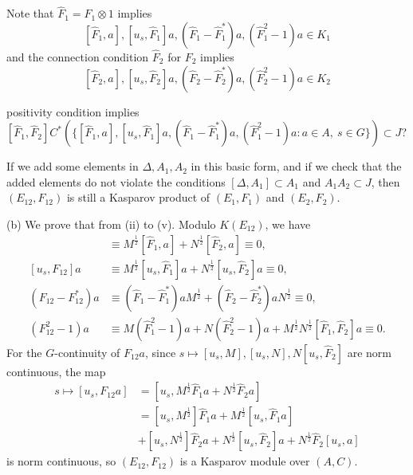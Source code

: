 \documentclass{../../large}
\begin{document}
\begin{prb}
\begin{parts}
Note that $\hat F_1=F_1\otimes1$ implies
\[[\hat F_1,a],[u_s,\hat F_1]a,(\hat F_1-\hat F_1^*)a,(\hat F_1^2-1)a\in K_1\]
and the connection condition $\hat F_2$ for $F_2$ implies
\[[\hat F_2,a],[u_s,\hat F_2]a,(\hat F_2-\hat F_2^*)a,(\hat F_2^2-1)a\in K_2\]


positivity condition implies $[\hat F_1,\hat F_2]C^*(\{[\hat F_1,a],[u_s,\hat F_1]a,(\hat F_1-\hat F_1^*)a,(\hat F_1^2-1)a:a\in A,\ s\in G\})\subset J$?


If we add some elements in $\Delta,A_1,A_2$ in this basic form, and if we check that the added elements do not violate the conditions $[\Delta,A_1]\subset A_1$ and $A_1A_2\subset J$, then $(E_{12},F_{12})$ is still a Kasparov product of $(E_1,F_1)$ and $(E_2,F_2)$.
\end{parts}
\end{prb}
\begin{pf}
(b)
We prove that from (ii) to (v).
Modulo $K(E_{12})$, we have
\begin{align*}
[F_{12},a]&\equiv M^{\frac12}[\hat F_1,a]+N^{\frac12}[\hat F_2,a]\equiv0,\\
[u_s,F_{12}]a&\equiv M^{\frac12}[u_s,\hat F_1]a+N^{\frac12}[u_s,\hat F_2]a\equiv0,\\
(F_{12}-F_{12}^*)a&\equiv(\hat F_1-\hat F_1^*)aM^{\frac12}+(\hat F_2-\hat F_2^*)aN^{\frac12}\equiv0,\\
(F_{12}^2-1)a&\equiv M(\hat F_1^2-1)a+N(\hat F_2^2-1)a+M^{\frac12}N^{\frac12}[\hat F_1,\hat F_2]a\equiv0.
\end{align*}
For the $G$-continuity of $F_{12}a$, since $s\mapsto[u_s,M],[u_s,N],N[u_s,\hat F_2]$ are norm continuous, the map
\begin{align*}
s\mapsto[u_s,F_{12}a]
&=[u_s,M^{\frac12}\hat F_1a+N^{\frac12}\hat F_2a]\\
&=[u_s,M^{\frac12}]\hat F_1a+M^{\frac12}[u_s,\hat F_1a]\\
&+[u_s,N^{\frac12}]\hat F_2a+N^{\frac12}[u_s,\hat F_2]a+N^{\frac12}\hat F_2[u_s,a]
\end{align*}
is norm continuous, so $(E_{12},F_{12})$ is a Kasparov module over $(A,C)$.


\end{pf}
\end{document}
